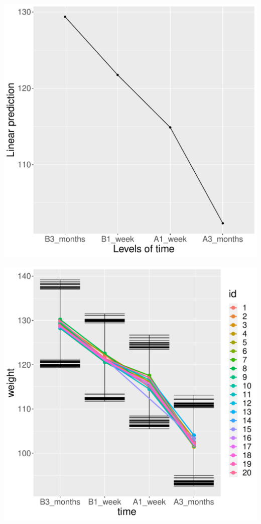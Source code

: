 \documentclass[12pt]{article}
\begin{document}
\begin{minipage}{0.45\linewidth}
\begin{center}
\includegraphics[width=\textwidth]{./figures/fit-emmip.pdf}
\end{center}
\end{minipage}
\begin{minipage}{0.45\linewidth}
\begin{center}
\includegraphics[width=\textwidth]{./figures/fit-autoplot.pdf}
\end{center}
\end{minipage}
\end{document}

